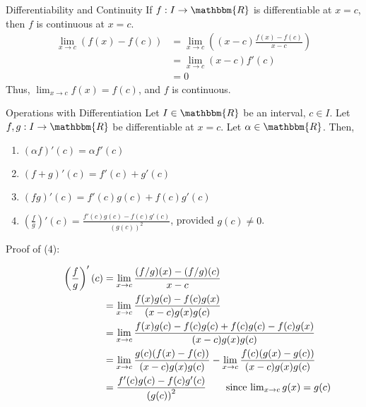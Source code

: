 \documentclass[10pt]{extarticle}
\newcommand{\R}{\mathbbm{R}}
\begin{document}
  \begin{problem}{Differentiability and Continuity}
    If $f: I\rightarrow \R$ is differentiable at $x=c$, then $f$ is continuous at $x=c$.
    \tcblower
    \begin{align*}
      \lim_{x\rightarrow c}\left(f(x) - f(c)\right) &= \lim_{x\rightarrow c}\left(\left(x-c\right)\frac{f(x) - f(c)}{x-c}\right)\\
                                                    &= \lim_{x\rightarrow c}(x-c)f'(c)\\
                                                    &= 0
    \end{align*}
    Thus, $\lim_{x\rightarrow c}f(x) = f(c)$, and $f$ is continuous.
  \end{problem}
  \begin{problem}{Operations with Differentiation}
    Let $I\in\R$ be an interval, $c\in I$. Let $f,g: I\rightarrow \R$ be differentiable at $x=c$. Let $\alpha\in\R$. Then,
    \begin{enumerate}[(1)]
      \item $\displaystyle(\alpha f)'(c) = \alpha f'(c)$
      \item $\displaystyle(f+g)'(c) = f'(c) + g'(c)$
      \item $\displaystyle(fg)'(c) = f'(c)g(c) + f(c)g'(c)$
      \item $\displaystyle\left(\frac{f}{g}\right)'(c) = \frac{f'(c)g(c)-f(c)g'(c)}{\left(g(c)\right)^2}$, provided $g(c) \neq 0$.
    \end{enumerate}
    \tcblower
    \begin{description}
      \item[Proof of (4):]
        \begin{align*}
          \left(\frac{f}{g}\right)'(c) &=\lim_{x\rightarrow c} \frac{(f/g)(x) - (f/g)(c)}{x-c}\\
                                       &= \lim_{x\rightarrow c} \frac{f(x)g(c) - f(c)g(x)}{(x-c)g(x)g(c)}\\
                                       &= \lim_{x\rightarrow c}\frac{f(x)g(c)-f(c)g(c) + f(c)g(c) - f(c)g(x)}{(x-c)g(x)g(c)}\\
                                       &= \lim_{x\rightarrow c}\frac{g(c)(f(x) - f(c))}{(x-c)g(x)g(c)} - \lim_{x\rightarrow c}\frac{f(c)(g(x) - g(c))}{(x-c)g(x)g(c)}\\
                                       &= \frac{f'(c)g(c) - f(c)g'(c)}{\left(g(c)\right)^2} \tag*{since $\lim_{x\rightarrow c}g(x) = g(c)$}
        \end{align*}
    \end{description}
  \end{problem}
\end{document}

